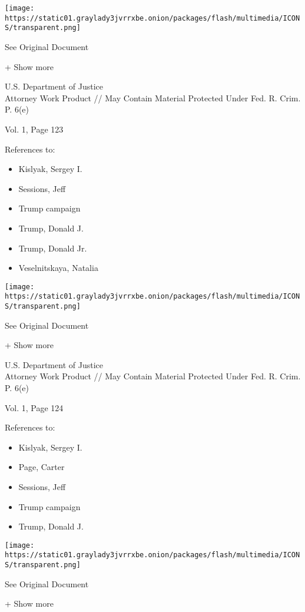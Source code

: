 \protect\hyperlink{}{}

\texttt{[image: https://static01.graylady3jvrrxbe.onion/packages/flash/multimedia/ICONS/transparent.png]}

See Original Document

+ Show more

U.S. Department of Justice\\
Attorney Work Product // May Contain Material Protected Under Fed. R.
Crim. P. 6(e)

Vol. 1, Page 123

References to:

\begin{itemize}
\tightlist
\item
  Kislyak, Sergey I.
\item
  Sessions, Jeff
\item
  Trump campaign
\item
  Trump, Donald J.
\item
  Trump, Donald Jr.
\item
  Veselnitskaya, Natalia
\end{itemize}

\protect\hyperlink{}{}

\texttt{[image: https://static01.graylady3jvrrxbe.onion/packages/flash/multimedia/ICONS/transparent.png]}

See Original Document

+ Show more

U.S. Department of Justice\\
Attorney Work Product // May Contain Material Protected Under Fed. R.
Crim. P. 6(e)

Vol. 1, Page 124

References to:

\begin{itemize}
\tightlist
\item
  Kislyak, Sergey I.
\item
  Page, Carter
\item
  Sessions, Jeff
\item
  Trump campaign
\item
  Trump, Donald J.
\end{itemize}

\protect\hyperlink{}{}

\texttt{[image: https://static01.graylady3jvrrxbe.onion/packages/flash/multimedia/ICONS/transparent.png]}

See Original Document

+ Show more

